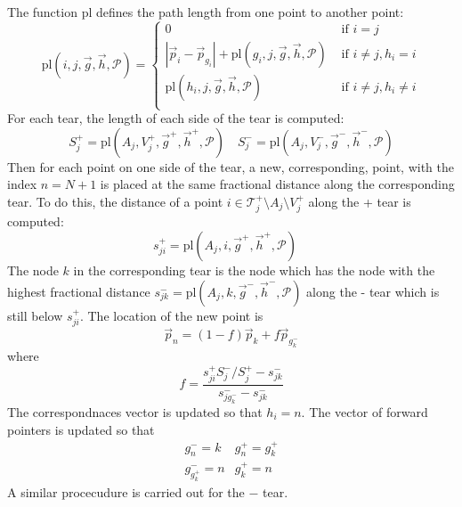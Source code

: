 \documentclass{article}
\begin{document}
The function $\mathrm{pl}$ defines the path length from one point to another
point:
\begin{displaymath}
  \mathrm{pl}(i, j, \vec{g}, \vec{h}, \mathcal{P}) = \left\{ 
    \begin{array}{ll}
      0 & \mbox{ if } i = j \\
      |\vec{p}_i-\vec{p}_{g_i}| + \mathrm{pl}(g_i, j, \vec{g}, \vec{h}, \mathcal{P}) & \mbox{ if } i \ne j, h_i=i \\
      \mathrm{pl}(h_i, j, \vec{g}, \vec{h}, \mathcal{P})    & \mbox{ if } i \ne j, h_i\ne i \\
    \end{array}\right.
\end{displaymath}
For each tear, the length of each side of the tear is computed:
\begin{displaymath}
  S^+_j = \mathrm{pl}(A_j, V^+_j, \vec{g}^+, \vec{h}^+, \mathcal{P}) \quad 
  S^-_j = \mathrm{pl}(A_j, V^-_j, \vec{g}^-, \vec{h}^-, \mathcal{P})
\end{displaymath}
Then for each point on one side of the tear, a new, corresponding,
point, with the index $n=N+1$ is placed at the same fractional
distance along the corresponding tear. To do this, the distance of a
point $i\in{\mathcal{T}^+_j}\setminus A_j \setminus V^+_j$ along the +
tear is computed:
\begin{displaymath}
  s^+_{ji} = \mathrm{pl}(A_j, i, \vec{g}^+, \vec{h}^+, \mathcal{P}) \quad 
\end{displaymath}
The node $k$ in the corresponding tear is the node which has the node
with the highest fractional distance $s^-_{jk}=\mathrm{pl}(A_j, k,
\vec{g}^-, \vec{h}^-, \mathcal{P})$ along the - tear which is still below
$s^+_{ji}$. The location of the new point is
\begin{displaymath}
  \vec{p}_n = (1-f)\vec{p}_k + f\vec{p}_{g^-_k}
\end{displaymath}
where
\begin{displaymath}
  f = \frac{s^+_{ji}S^-_j/S^+_j-s^-_{jk}}{s^-_{jg^-_k}-s^-_{jk}}
\end{displaymath}
The correspondnaces vector is updated so that $h_i = n$. The vector of
forward pointers is updated so that
\begin{displaymath}
  \begin{array}{ll}
    g^-_n = k     & g^+_n = g^+_k \\
    g^-_{g^+_k} = n & g^+_k = n 
  \end{array}
\end{displaymath}
A similar procecudure is carried out for the $-$ tear.
\end{document}

